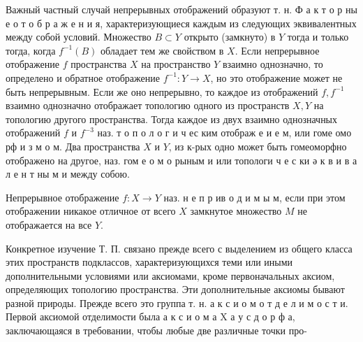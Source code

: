 \documentclass[10pt]{article}
\begin{document}
Важный частный случай непрерывных отображений образуют т. н. Ф а к т о р ны е о т о б р а ж е н и я, характеризующиеся каждым из следующих эквивалентных между собой условий. Множество $B \subset Y$ открыто (замкнуто) в $Y$ тогда и только тогда, когда $f^{-1}(B)$ обладает тем же свойством в $X$. Если непрерывное отображение $f$ пространства $X$ на пространство $Y$ взаимно однозначно, то определено и обратное отображение $f^{-1}: Y \rightarrow X$, но это отображение может не быть непрерывным. Если же оно непрерывно, то каждое из отображений $f, f^{-1}$ взаимно однозначно отображает топологию одного из пространств $X, Y$ на топологию другого пространства. Тогда каждое из двух взаимно однозначных отображений $f$ и $f^{-3}$ наз. т о п о л о г и ч ес ким отображ е и е м, или гоме омо рф и з м о м. Два пространства $X$ и $Y$, из к-рых одно может быть гомеоморфно отображено на другое, наз. гом е о м о рыным и или топологи ч е с ки ә к в и в а л е н т ны м и между собою.



Непрерывное отображение $f: X \rightarrow Y$ наз. н е п р ив о д и м ы м, если при этом отображении никакое отличное от всего $X$ замкнутое множество $M$ не отображается на все $Y$.



Конкретное изучение Т. П. связано прежде всего с выделением из общего класса этих пространств подклассов, характеризующихся теми или иными дополнительными условиями или аксиомами, кроме первоначальных аксиом, определяющих топологию пространства. Эти дополнительные аксиомы бывают разной природы. Прежде всего это группа т. н. а к с и о м о т д е л и м о с т и. Первой аксиомой отделимости была а к с и о м а X а у с д о р ф а, заключающаяся в требовании, чтобы любые две различные точки про-
\end{document}
